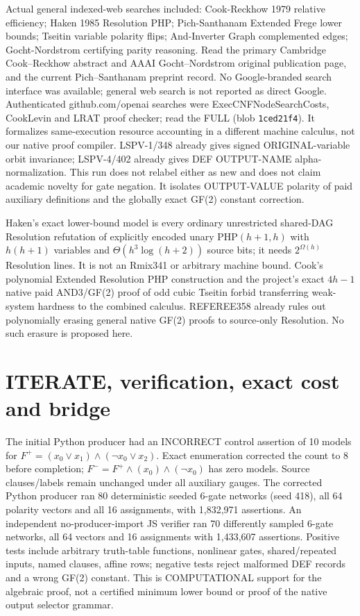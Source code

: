 \documentclass[11pt]{article}
\begin{document}
Actual general indexed-web searches included: Cook-Reckhow 1979 relative efficiency; Haken 1985 Resolution PHP; Pich-Santhanam Extended Frege lower bounds; Tseitin variable polarity flips; And-Inverter Graph complemented edges; Gocht-Nordstrom certifying parity reasoning. Read the primary Cambridge Cook--Reckhow abstract and AAAI Gocht--Nordstrom original publication page, and the current Pich--Santhanam preprint record. No Google-branded search interface was available; general web search is not reported as direct Google. Authenticated github.com/openai searches were ExecCNFNodeSearchCosts, CookLevin and LRAT proof checker; read the FULL  (blob \texttt{1ced21f4}). It formalizes same-execution resource accounting in a different machine calculus, not our native proof compiler. LSPV-1/348 already gives signed ORIGINAL-variable orbit invariance; LSPV-4/402 already gives DEF OUTPUT-NAME alpha-normalization. This run does not relabel either as new and does not claim academic novelty for gate negation. It isolates OUTPUT-VALUE polarity of paid auxiliary definitions and the globally exact GF(2) constant correction.

Haken's exact lower-bound model is every ordinary unrestricted shared-DAG Resolution refutation of explicitly encoded unary PHP$(h+1,h)$ with $h(h+1)$ variables and $\Theta(h^3\log(h+2))$ source bits; it needs $2^{\Omega(h)}$ Resolution lines. It is not an Rmix341 or arbitrary machine bound. Cook's polynomial Extended Resolution PHP construction and the project's exact $4h-1$ native paid AND3/GF(2) proof of odd cubic Tseitin forbid transferring weak-system hardness to the combined calculus. REFEREE358 already rules out polynomially erasing general native GF(2) proofs to source-only Resolution. No such erasure is proposed here.

\section*{ITERATE, verification, exact cost and bridge}
The initial Python producer had an INCORRECT control assertion of 10 models for $F^+=(x_0\vee x_1)\wedge(\neg x_0\vee x_2)$. Exact enumeration corrected the count to 8 before completion; $F^-=F^+\wedge(x_0)\wedge(\neg x_0)$ has zero models. Source clauses/labels remain unchanged under all auxiliary gauges. The corrected Python producer ran 80 deterministic seeded 6-gate networks (seed 418), all 64 polarity vectors and all 16 assignments, with 1,832,971 assertions. An independent no-producer-import JS verifier ran 70 differently sampled 6-gate networks, all 64 vectors and 16 assignments with 1,433,607 assertions. Positive tests include arbitrary truth-table functions, nonlinear gates, shared/repeated inputs, named clauses, affine rows; negative tests reject malformed DEF records and a wrong GF(2) constant. This is COMPUTATIONAL support for the algebraic proof, not a certified minimum lower bound or proof of the native output selector grammar.
\end{document}
